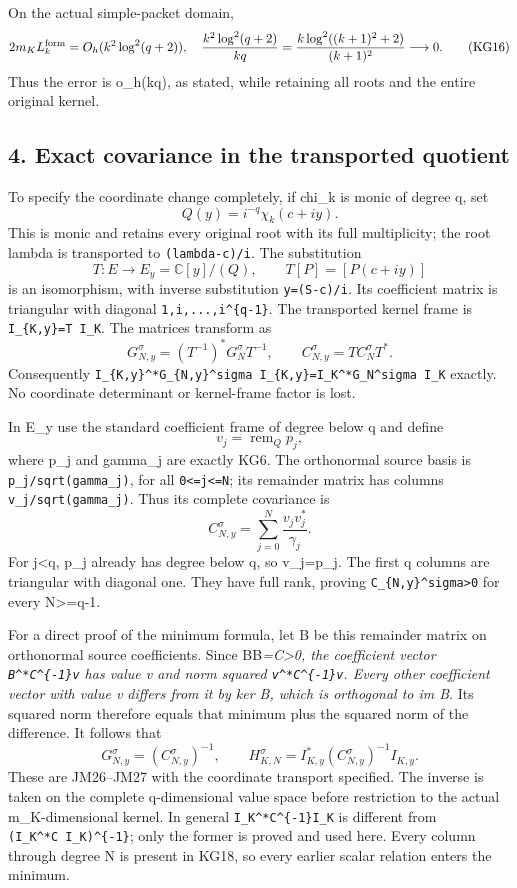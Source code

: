 On the actual simple-packet domain, \[
2m_KL_k^{\rm form}=O_h(k^2\log^2(q+2)),\quad
\frac{k^2\log^2(q+2)}{kq}
=\frac{k\log^2((k+1)^2+2)}{(k+1)^2}\longrightarrow0.
\tag{KG16}
\] Thus the error is o\_h(kq), as stated, while retaining all roots and the entire original kernel.

\subsection{4. Exact covariance in the transported quotient}\label{mrkg:exact-covariance-in-the-transported-quotient}

To specify the coordinate change completely, if chi\_k is monic of degree q, set \[
Q(y)=i^{-q}\chi_k(c+iy).
\] This is monic and retains every original root with its full multiplicity; the root lambda is transported to \texttt{(lambda-c)/i}. The substitution \[
T:E\longrightarrow E_y=\mathbb C[y]/(Q),\qquad
T[P]=[P(c+iy)]
\tag{KG17}
\] is an isomorphism, with inverse substitution \texttt{y=(S-c)/i}. Its coefficient matrix is triangular with diagonal \texttt{1,i,...,i\^{}\{q-1\}}. The transported kernel frame is \texttt{I\_\{K,y\}=T\ I\_K}. The matrices transform as \[
G_{N,y}^\sigma=(T^{-1})^*G_N^\sigma T^{-1},\qquad
C_{N,y}^\sigma=T C_N^\sigma T^*.
\] Consequently \texttt{I\_\{K,y\}\^{}*G\_\{N,y\}\^{}sigma\ I\_\{K,y\}=I\_K\^{}*G\_N\^{}sigma\ I\_K} exactly. No coordinate determinant or kernel-frame factor is lost.

In E\_y use the standard coefficient frame of degree below q and define \[
v_j=\operatorname{rem}_Qp_j,
\] where p\_j and gamma\_j are exactly KG6. The orthonormal source basis is \texttt{p\_j/sqrt(gamma\_j)}, for all \texttt{0\textless{}=j\textless{}=N}; its remainder matrix has columns \texttt{v\_j/sqrt(gamma\_j)}. Thus its complete covariance is \[
C_{N,y}^\sigma=\sum_{j=0}^N\frac{v_jv_j^*}{\gamma_j}.
\tag{KG18}
\] For j\textless q, p\_j already has degree below q, so v\_j=p\_j. The first q columns are triangular with diagonal one. They have full rank, proving \texttt{C\_\{N,y\}\^{}sigma\textgreater{}0} for every N\textgreater=q-1.

For a direct proof of the minimum formula, let B be this remainder matrix on orthonormal source coefficients. Since BB\emph{=C\textgreater0, the coefficient vector \texttt{B\^{}*C\^{}\{-1\}v} has value v and norm squared \texttt{v\^{}*C\^{}\{-1\}v}. Every other coefficient vector with value v differs from it by ker B, which is orthogonal to im B}. Its squared norm therefore equals that minimum plus the squared norm of the difference. It follows that \[
G_{N,y}^\sigma=(C_{N,y}^\sigma)^{-1},\qquad
\boxed{H_{K,N}^\sigma=I_{K,y}^*(C_{N,y}^\sigma)^{-1}I_{K,y}.}
\tag{KG19}
\] These are JM26--JM27 with the coordinate transport specified. The inverse is taken on the complete q-dimensional value space before restriction to the actual m\_K-dimensional kernel. In general \texttt{I\_K\^{}*C\^{}\{-1\}I\_K} is different from \texttt{(I\_K\^{}*C\ I\_K)\^{}\{-1\}}; only the former is proved and used here. Every column through degree N is present in KG18, so every earlier scalar relation enters the minimum.


